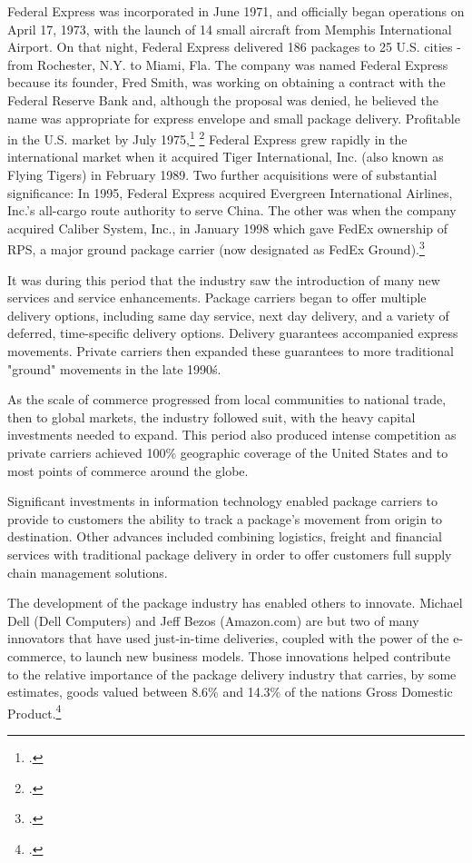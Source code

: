 Federal Express was incorporated in June 1971, and officially began operations on April 17, 1973, with the launch of 14 small aircraft from Memphis International Airport. On that night, Federal Express delivered 186 packages to 25 U.S. cities - from Rochester, N.Y. to Miami, Fla. The company was named Federal Express because its founder, Fred Smith, was working on obtaining a contract with the Federal Reserve Bank and, although the proposal was denied, he believed the name was appropriate for express envelope and small package delivery.  Profitable in the U.S. market by July 1975,\footcite{uspsManual}  \footcite{nalcManual} Federal Express grew rapidly in the international market when it acquired Tiger International, Inc. (also known as Flying Tigers) in February 1989.  Two further acquisitions were of substantial significance:  In 1995, Federal Express acquired Evergreen International Airlines, Inc.'s all-cargo route authority to serve China.  The other was when the company acquired Caliber System, Inc., in January 1998 which gave FedEx ownership of RPS, a major ground package carrier (now designated as FedEx Ground).\footcite{fedexHistory}

It was during this period that the industry saw the introduction of many new services and service enhancements.  Package carriers began to offer multiple delivery options, including same day service, next day delivery, and a variety of deferred, time-specific delivery options.  Delivery guarantees accompanied express movements.  Private carriers then expanded these guarantees to more traditional "ground" movements in the late 1990\'s.

As the scale of commerce progressed from local communities to national trade, then to global markets, the industry followed suit, with the heavy capital investments needed to expand.  This period also produced intense competition as private carriers achieved 100\% geographic coverage of the United States and to most points of commerce around the globe.

Significant investments in information technology enabled package carriers to provide to customers the ability to track a package’s movement from origin to destination.  Other advances included combining logistics, freight and financial services with traditional package delivery in order to offer customers full supply chain management solutions.  

The development of the package industry has enabled others to innovate.  Michael Dell (Dell Computers) and Jeff Bezos (Amazon.com) are but two of many innovators that have used just-in-time deliveries, coupled with the power of the e-commerce, to launch new business models. Those innovations helped contribute to the relative importance of the package delivery industry that carries, by some estimates, goods valued between 8.6\% and 14.3\% of the nations Gross Domestic Product.\footcite{JRCEC}

